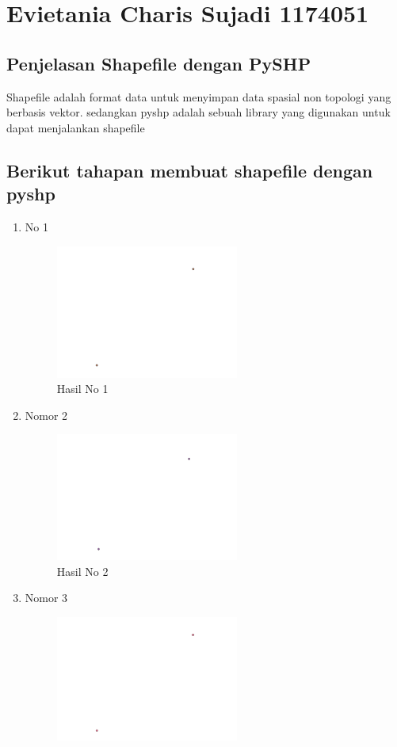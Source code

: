 \section{Evietania Charis Sujadi 1174051}
\subsection{Penjelasan Shapefile dengan PySHP}
Shapefile adalah format data untuk menyimpan data spasial non topologi yang berbasis vektor. sedangkan pyshp adalah sebuah library yang digunakan untuk dapat menjalankan shapefile \hfill\break

\subsection{Berikut tahapan membuat shapefile dengan pyshp}
\begin{enumerate}
	\item No 1
	
	\begin{figure}[H]
		\includegraphics[width=6cm]{figures/1174051/2/1.PNG}
		\centering
		\caption{Hasil No 1}
	\end{figure}
	\item Nomor 2
	
	\begin{figure}[H]
		\includegraphics[width=6cm]{figures/1174051/2/2.PNG}
		\centering
		\caption{Hasil No 2}
	\end{figure}
	\item Nomor 3
	
	\begin{figure}[H]
		\includegraphics[width=6cm]{figures/1174051/2/3.PNG}

\end{figure}
\end{enumerate}

